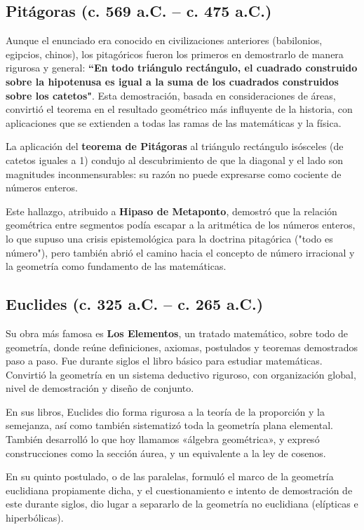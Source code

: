 \documentclass[a4paper,12pt]{article} %
\begin{document}
\subsection{Pitágoras (c. 569 a.C. -- c. 475 a.C.)}
\begin{justify}
	Aunque el enunciado era conocido en civilizaciones anteriores (babilonios, egipcios, chinos), los pitagóricos fueron los 
	primeros en demostrarlo de manera rigurosa y general: \textbf{``En todo triángulo rectángulo, el cuadrado construido sobre la hipotenusa 
	es igual a la suma de los cuadrados construidos sobre los catetos"}. Esta demostración, basada en consideraciones de áreas,
	convirtió el teorema en el resultado geométrico más influyente de la historia, con aplicaciones que se extienden a todas las 
	ramas de las matemáticas y la física.
\end{justify}
\begin{justify}
	La aplicación del \textbf{teorema de Pitágoras} al triángulo rectángulo isósceles (de catetos iguales a 1) condujo al descubrimiento de que 
	la diagonal y el lado son magnitudes inconmensurables: su razón no puede expresarse como cociente de números enteros. 
\end{justify}
\begin{justify}
	Este hallazgo, atribuido a \textbf{Hipaso de Metaponto}, demostró que la relación geométrica entre segmentos podía escapar a la aritmética
	de los números enteros, lo que supuso una crisis epistemológica para la doctrina pitagórica ("todo es número"), pero también abrió 
	el camino hacia el concepto de número irracional y la geometría como fundamento de las matemáticas.
\end{justify}

\subsection{Euclides (c. 325 a.C. -- c. 265 a.C.)}
\begin{justify}
	Su obra más famosa es \textbf{Los Elementos}, un tratado
	matemático, sobre todo de geometría, donde reúne definiciones, axiomas, postulados y teoremas
	demostrados paso a paso. Fue durante siglos el libro básico para estudiar matemáticas. Convirtió la
	geometría en un sistema deductivo riguroso, con organización global, nivel de demostración y
	diseño de conjunto.
\end{justify}
\begin{justify}
	En sus libros, Euclides dio forma rigurosa a la teoría de la proporción y la semejanza, así como
	también sistematizó toda la geometría plana elemental.
	También desarrolló lo que hoy llamamos «álgebra geométrica», y expresó construcciones como la
	sección áurea, y un equivalente a la ley de cosenos.
\end{justify}
\begin{justify}
	En su quinto postulado, o de las paralelas, formuló el marco de la geometría euclidiana propiamente
	dicha, y el cuestionamiento e intento de demostración de este durante siglos, dio lugar a separarlo de
	la geometría no euclidiana (elípticas e hiperbólicas).
\end{justify}
\end{document}
